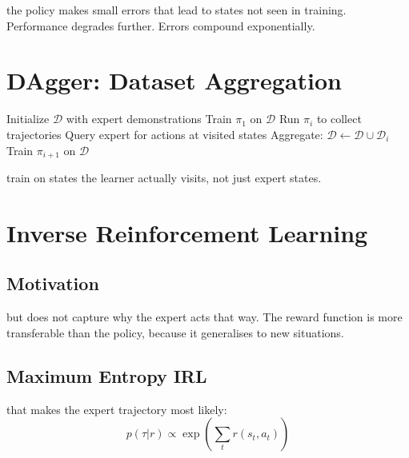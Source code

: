  the policy makes small errors that lead to states not seen in training. Performance degrades further. Errors compound exponentially.


\section{DAgger: Dataset Aggregation}


\begin{algorithm}[H]
\caption{DAgger}
\begin{algorithmic}[1]
\State Initialize $\mathcal{D}$ with expert demonstrations
\State Train $\pi_1$ on $\mathcal{D}$
    \State Run $\pi_i$ to collect trajectories
    \State Query expert for actions at visited states
    \State Aggregate: $\mathcal{D} \gets \mathcal{D} \cup \mathcal{D}_i$
    \State Train $\pi_{i+1}$ on $\mathcal{D}$
\EndFor
\end{algorithmic}
\end{algorithm}

 train on states the learner actually visits, not just expert states.


\section{Inverse Reinforcement Learning}


\subsection{Motivation}

 but does not capture why the expert acts that way. The reward function is more transferable than the policy, because it generalises to new situations.

\subsection{Maximum Entropy IRL}

 that makes the expert trajectory most likely:
\begin{equation}
    p(\tau | r) \propto \exp\left(\sum_t r(s_t, a_t)\right)
\end{equation}

